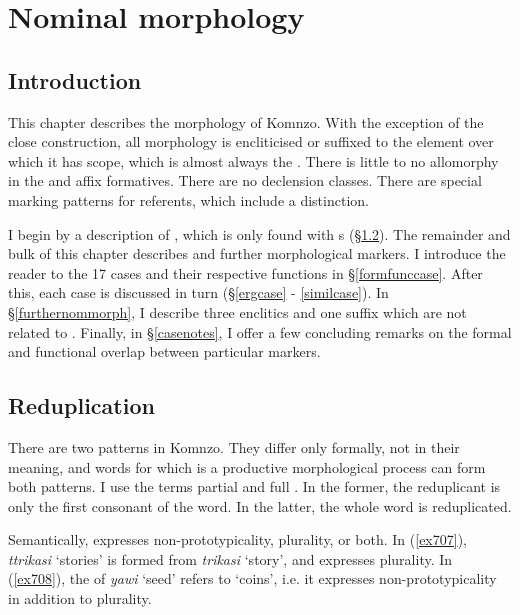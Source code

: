 \chapter{Nominal morphology}
\label{cha:nominals-chapter}

\section{Introduction} \label{nommorphintro}

This chapter describes the  morphology of Komnzo. With the exception of the close  construction, all  morphology is encliticised or suffixed to the element over which it has scope, which is almost always the . There is little to no allomorphy in the  and affix formatives. There are no declension classes. There are special marking patterns for  referents, which include a  distinction.%

I begin by a description of , which is only found with s (\S{}\ref{nomreduplication}). The remainder and bulk of this chapter describes  and further morphological markers. I introduce the reader to the 17 cases and their respective functions in \S{}\ref{formfunccase}. After this, each case is discussed in turn (\S{}\ref{ergcase} - \ref{similcase}). In \S{}\ref{furthernommorph}, I describe three enclitics and one suffix which are not related to . Finally, in \S{}\ref{casenotes}, I offer a few concluding remarks on the formal and functional overlap between particular  markers.

\section{Reduplication}\label{nomreduplication}

There are two  patterns in Komnzo. They differ only formally, not in their meaning, and words for which  is a productive morphological process can form both patterns. I use the terms partial  and full . In the former, the reduplicant is only the first consonant of the word. In the latter, the whole word is reduplicated.%

Semantically,  expresses non-prototypicality, plurality, or both. In (\ref{ex707}), \emph{ttrikasi} `stories' is formed from \emph{trikasi} `story', and  expresses plurality. In (\ref{ex708}), the  of \emph{yawi} `seed' refers to `coins', i.e. it expresses non-prototypicality in addition to plurality. 

